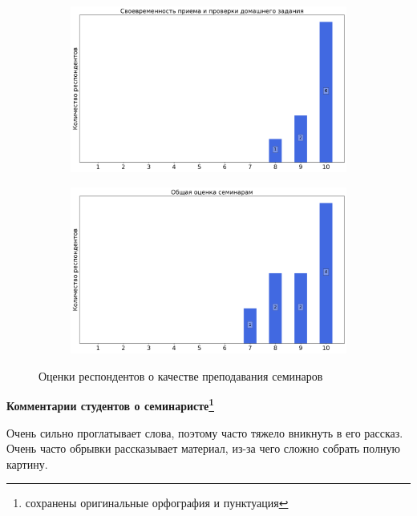 \begin{figure}[H]
\begin{subfigure}[b]{0.45\textwidth}
                    \centering
                    \includegraphics[width=\textwidth]{images/3 course/Общая физика - квантовая физика/seminarists-marks-Аникин Ю.А.-2.png}
                \end{subfigure}
                \begin{subfigure}[b]{0.45\textwidth}
                    \centering
                    \includegraphics[width=\textwidth]{images/3 course/Общая физика - квантовая физика/seminarists-marks-Аникин Ю.А.-3.png}
                \end{subfigure}	
                \caption{Оценки респондентов о качестве преподавания семинаров}
            \end{figure}

            \textbf{Комментарии студентов о семинаристе\protect\footnote{сохранены оригинальные орфография и пунктуация}}
                \begin{commentbox} 
                    Очень сильно проглатывает слова, поэтому часто тяжело вникнуть в его рассказ. Очень часто обрывки рассказывает материал, из-за чего сложно собрать полную картину. 
                \end{commentbox} 
            
